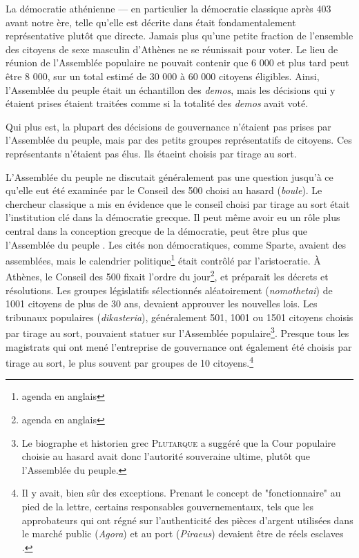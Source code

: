 La démocratie athénienne --- en particulier la démocratie classique après
403 avant notre ère, telle qu'elle est décrite dans \cite{hans99}
\cite{hans99} \cite{hans99} était fondamentalement
représentative plutôt que directe. Jamais plus qu'une petite fraction
de l'ensemble des citoyens de sexe masculin d'Athènes ne se réunissait
pour voter. Le lieu de réunion de l'Assemblée populaire ne pouvait
contenir que 6 000 et plus tard peut être 8 000, sur un total estimé
de 30 000 à 60 000 citoyens éligibles. Ainsi, l'Assemblée du peuple
était un échantillon des \emph{demos}, mais les décisions qui y
étaient prises étaient traitées comme si la totalité des \emph{demos}
avait voté.\par  
Qui plus est, la plupart des décisions de gouvernance n'étaient pas
prises par l'Assemblée du peuple, mais par des petits groupes
représentatifs de citoyens. Ces représentants n'étaient pas élus. Ils 
étaeint choisis par tirage au sort.\par
L'Assemblée du peuple ne discutait généralement pas une question
jusqu'à ce qu'elle eut été examinée par le Conseil des 500 choisi au
hasard (\emph{boule}). Le chercheur classique \cite{ober07} a
mis en évidence que le conseil choisi par tirage au sort était
l'institution clé dans la démocratie grecque. Il peut même avoir eu
un rôle plus central dans la conception grecque de la démocratie, peut
être plus que l'Assemblée du peuple \cite{ober07}. Les cités
non démocratiques, comme Sparte, avaient des assemblées, mais
le calendrier politique\footnote{agenda en anglais}
était contrôlé par l'aristocratie. \`A Athènes, le Conseil des 500
fixait l'ordre du jour\footnote{agenda en anglais}, et préparait les
décrets et résolutions. Les groupes législatifs sélectionnés
aléatoirement (\emph{nomothetai}) de 1001 citoyens de 
plus de 30 ans, devaient approuver les nouvelles lois. Les tribunaux
populaires (\emph{dikasteria}), généralement 501, 1001 ou 1501
citoyens choisis par tirage au sort, pouvaient statuer sur l'Assemblée
populaire\footnote{%
  Le biographe et historien grec \textsc{Plutarque} a
  suggéré que la Cour populaire choisie au hasard avait donc
  l'autorité souveraine ultime, plutôt que l'Assemblée du
  peuple.%
}. Presque tous les magistrats qui ont mené l'entreprise
de gouvernance ont également été choisis par tirage au sort, le plus
souvent par groupes de 10 citoyens.\footnote{%
  Il y avait, bien sûr des exceptions. Prenant le concept de
  "fonctionnaire" au pied de la lettre, certains responsables gouvernementaux,
  tels que les approbateurs qui ont régné sur l'authenticité des
  pièces d'argent utilisées dans le marché public (\emph{Agora}) et au
  port (\emph{Piraeus}) devaient être de réels esclaves
  \cite{ober08}.%
}\par  
